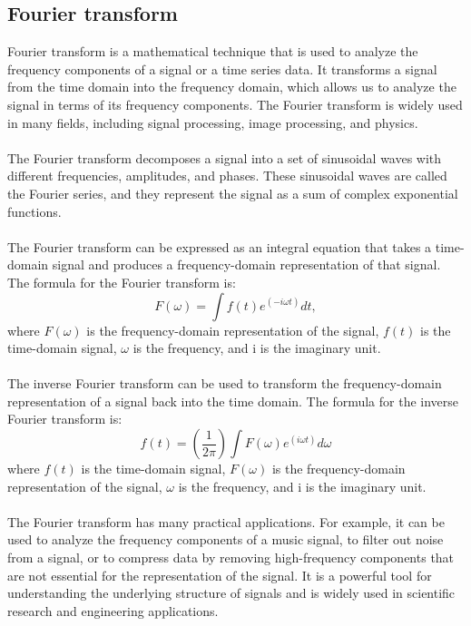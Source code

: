         \subsection{Fourier transform}
        Fourier transform is a mathematical technique that is used to analyze the frequency components of a signal or a time series data.
        It transforms a signal from the time domain into the frequency domain, which allows us to analyze the signal in terms of its frequency components.
        The Fourier transform is widely used in many fields, including signal processing, image processing, and physics.\\
        \\
        The Fourier transform decomposes a signal into a set of sinusoidal waves with different frequencies, amplitudes, and phases.
        These sinusoidal waves are called the Fourier series, and they represent the signal as a sum of complex exponential functions.\\
        \\
        The Fourier transform can be expressed as an integral equation that takes a time-domain signal and produces a frequency-domain
        representation of that signal. The formula for the Fourier transform is:\\
        \begin{equation}
            F(\omega) = \int f(t) e^{(-i \omega t)} dt,
        \end{equation}
        where $F(\omega)$ is the frequency-domain representation of the signal, $f(t)$ is the time-domain signal, $\omega$ is the frequency,
        and i is the imaginary unit.\\
        \\
        The inverse Fourier transform can be used to transform the frequency-domain representation of a signal back into the time domain.
        The formula for the inverse Fourier transform is:
        \begin{equation}
            f(t) = (\frac{1}{2\pi}) \int F(\omega) e^{(i \omega t)} d\omega
        \end{equation}
        where $f(t)$ is the time-domain signal, $F(\omega)$ is the frequency-domain representation of the signal, $\omega$ is the frequency,
        and i is the imaginary unit.\\
        \\
        The Fourier transform has many practical applications. For example, it can be used to analyze the frequency components of a music signal,
        to filter out noise from a signal, or to compress data by removing high-frequency components that are not essential for the representation of the signal.
        It is a powerful tool for understanding the underlying structure of signals and is widely used in scientific research and engineering applications.
